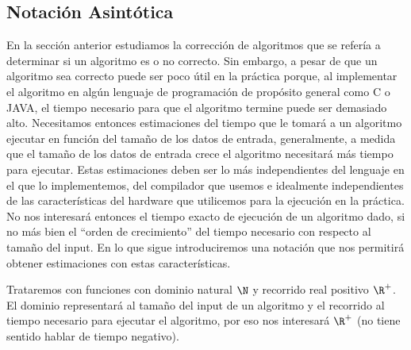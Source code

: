 \subsection{Notación Asintótica}
En la sección anterior estudiamos la corrección de algoritmos que se refería a determinar si un algoritmo es o no correcto.
Sin embargo, a pesar de que un algoritmo sea correcto puede ser poco útil en la práctica porque, al implementar el algoritmo en algún lenguaje de programación de propósito general como C o JAVA, el tiempo necesario para que el algoritmo termine puede ser demasiado alto.
Necesitamos entonces estimaciones del tiempo que le tomará a un algoritmo ejecutar en función del tamaño de los datos de entrada, generalmente, a medida que el tamaño de los datos de entrada crece el algoritmo necesitará más tiempo para ejecutar.
Estas estimaciones deben ser lo más independientes del lenguaje en el que lo implementemos, del compilador que usemos e idealmente independientes de las características del hardware que utilicemos para la ejecución en la práctica.
No nos interesará entonces el tiempo exacto de ejecución de un algoritmo dado, si no más bien el ``orden de crecimiento'' del tiempo necesario con respecto al tamaño del input.
En lo que sigue introduciremos una notación que nos permitirá obtener estimaciones con estas características.

Trataremos con funciones con dominio natural $\N$ y recorrido real positivo $\R^+$.
El dominio representará al tamaño del input de un algoritmo y el recorrido al tiempo necesario para ejecutar el algoritmo, por eso nos interesará $\R^+$ (no tiene sentido hablar de tiempo negativo).

